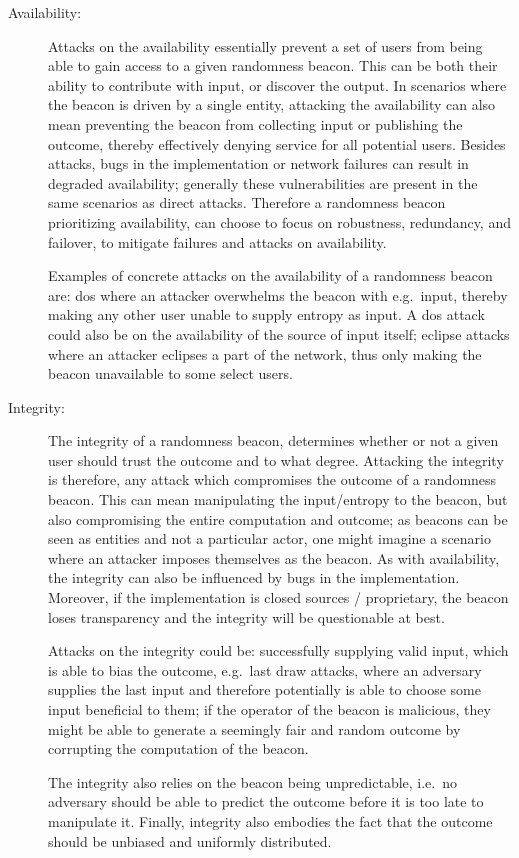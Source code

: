 \begin{description}

    \item[Availability:]
        Attacks on the availability essentially prevent a set of users from being able to gain access to a given randomness beacon.
        This can be both their ability to contribute with input, or discover the output.
        In scenarios where the beacon is driven by a single entity, attacking the availability can also mean preventing the beacon from collecting input or publishing the outcome, thereby effectively denying service for all potential users.
        Besides attacks, bugs in the implementation or network failures can result in degraded availability;
        generally these vulnerabilities are present in the same scenarios as direct attacks.
        Therefore a randomness beacon prioritizing availability, can choose to focus on robustness, redundancy, and failover, to mitigate failures and attacks on availability.

        Examples of concrete attacks on the availability of a randomness beacon are:
        \acrfull{dos} where an attacker overwhelms the beacon with e.g.\ input, thereby making any other user unable to supply entropy as input. A \gls{dos} attack could also be on the availability of the source of input itself; eclipse attacks where an attacker eclipses a part of the network, thus only making the beacon unavailable to some select users.

    \item[Integrity:]
        The integrity of a randomness beacon, determines whether or not a given user should trust the outcome and to what degree.
        Attacking the integrity is therefore, any attack which compromises the outcome of a randomness beacon.
        This can mean manipulating the input/entropy to the beacon, but also compromising the entire computation and outcome;
        as beacons can be seen as entities and not a particular actor, one might imagine a scenario where an attacker imposes themselves as the beacon.
        As with availability, the integrity can also be influenced by bugs in the implementation.
        Moreover, if the implementation is closed sources / proprietary, the beacon loses transparency and the integrity will be questionable at best.

        Attacks on the integrity could be: successfully supplying valid input, which is able to bias the outcome, e.g.\ last draw attacks, where an adversary supplies the last input and therefore potentially is able to choose some input beneficial to them;
        if the operator of the beacon is malicious, they might be able to generate a seemingly fair and random outcome by corrupting the computation of the beacon.

        The integrity also relies on the beacon being unpredictable, i.e.\ no adversary should be able to predict the outcome before it is too late to manipulate it.
        Finally, integrity also embodies the fact that the outcome should be unbiased and uniformly distributed.

\end{description}

